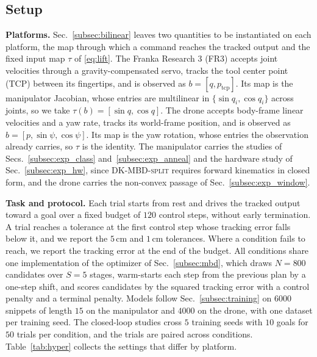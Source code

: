 \documentclass[letterpaper,10pt,conference]{ieeeconf}
\newcommand{\dksplit}{\textsc{DK-MBD-split}}
\begin{document}
\subsection{Setup}\label{subsec:setup}

\textbf{Platforms.}
Sec.~\ref{subsec:bilinear} leaves two quantities to be instantiated on each platform, the map through which a command reaches the tracked output and the fixed input map $\tau$ of \eqref{eq:lift}.
The Franka Research 3 (FR3) accepts joint velocities through a gravity-compensated servo, tracks the tool center point (TCP) between its fingertips, and is observed as $b = [q, p_{\mathrm{tcp}}]$.
Its map is the manipulator Jacobian, whose entries are multilinear in $\{\sin q_i, \cos q_i\}$ across joints, so we take $\tau(b) = [\sin q, \cos q]$.
The drone accepts body-frame linear velocities and a yaw rate, tracks its world-frame position, and is observed as $b = [p, \sin\psi, \cos\psi]$.
Its map is the yaw rotation, whose entries the observation already carries, so $\tau$ is the identity.
The manipulator carries the studies of Secs.~\ref{subsec:exp_class} and~\ref{subsec:exp_anneal} and the hardware study of Sec.~\ref{subsec:exp_hw}, since \dksplit{} requires forward kinematics in closed form, and the drone carries the non-convex passage of Sec.~\ref{subsec:exp_window}.

\textbf{Task and protocol.}
Each trial starts from rest and drives the tracked output toward a goal over a fixed budget of $120$ control steps, without early termination.
A trial reaches a tolerance at the first control step whose tracking error falls below it, and we report the $5$\,cm and $1$\,cm tolerances.
Where a condition fails to reach, we report the tracking error at the end of the budget.
All conditions share one implementation of the optimizer of Sec.~\ref{subsec:mbd}, which draws $N = 800$ candidates over $S = 5$ stages, warm-starts each step from the previous plan by a one-step shift, and scores candidates by the squared tracking error with a control penalty and a terminal penalty.
Models follow Sec.~\ref{subsec:training} on $6000$ snippets of length $15$ on the manipulator and $4000$ on the drone, with one dataset per training seed.
The closed-loop studies cross $5$ training seeds with $10$ goals for $50$ trials per condition, and the trials are paired across conditions.
Table~\ref{tab:hyper} collects the settings that differ by platform.
\end{document}
